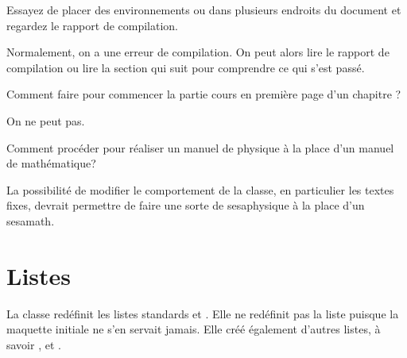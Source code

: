 \documentclass[nocrop]{sesamanuel}
\begin{document}
\begin{autoeval}
  \begin{multicols}{2}
    \begin{exercice}
      Essayez de placer des environnements  ou
       dans plusieurs endroits du document et
      regardez le rapport de compilation.
    \end{exercice}
    \begin{corrige}
      Normalement, on a une erreur de compilation. On peut alors lire
      le rapport de compilation ou lire la section qui suit pour
      comprendre ce qui s'est passé.
    \end{corrige}
    \begin{exercice}
      Comment faire pour commencer la partie cours en première page
      d'un chapitre ?
    \end{exercice}
    \begin{corrige}
      On ne peut pas.
    \end{corrige}
    \vfill\columnbreak
    \begin{exercice}
      Comment procéder pour réaliser un manuel de physique à la place
      d'un manuel de mathématique?
    \end{exercice}
    \begin{corrige}
      La possibilité de modifier le comportement de la classe, en
      particulier les textes fixes, devrait permettre de faire une
      sorte de sesaphysique à la place d'un sesamath.
    \end{corrige}
  \end{multicols}
\end{autoeval}

\cours
\section{Listes}
\label{sec-listes}
La classe redéfinit les listes standards  et
. Elle ne redéfinit pas la liste
 puisque la maquette initiale ne s'en servait
jamais. Elle créé également d'autres listes, à savoir
,  et
.
\end{document}
